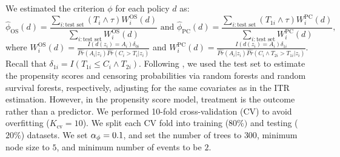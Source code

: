 We estimated the criterion $\phi$ for each policy $d$ as:
\begin{equation}
    \hat{\phi}_\text{OS}(d) = \frac{\sum_{i:\text{test set}}(T_i \wedge \tau)W_i^\text{OS}(d)}{\sum_{i:\text{test set}}W_i^\text{OS}(d)} \text{ and }
    \hat{\phi}_\text{PC}(d) = \frac{\sum_{i:\text{test set}}(T_{1i} \wedge \tau)W_i^\text{PC}(d)}{\sum_{i:\text{test set}}W_i^\text{PC}(d)},
\end{equation}
where $W_i^\text{OS}(d) = \frac{I(d(z_i)=A_i)\delta_{0i}}{\hat{Pr}(A_i|z_i)\hat{Pr}(C_i>T_i|z_i)}$ and $W_i^\text{PC}(d) = \frac{I(d(z_i)=A_i)\delta_{1i}}{\hat{Pr}(A_i|z_i)\hat{Pr}(C_i \wedge T_{2i} > T_{1i}|z_i)}$.
Recall that $\delta_{1i} = I(T_{1i} \le C_i\wedge T_{2i})$. Following \cite{cho_multi-stage_2023}, we used the test set to estimate the propensity scores and censoring probabilities via random forests and random survival forests, respectively, adjusting for the same covariates as in the ITR estimation. However, in the propensity score model, treatment is the outcome rather than a predictor. We performed 10-fold cross-validation (CV) to avoid overfitting ($K_{\text{cv}} = 10$). We split each CV fold into training ($80\%)$ and testing ($20\%$) datasets. We set $\alpha_{\phi} = 0.1$, and set the number of trees to $300$, minimum node size to $5$, and minimum number of events to be $2$.